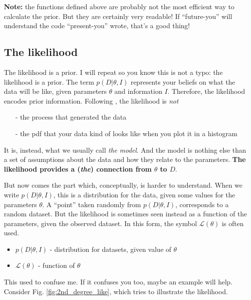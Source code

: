 \documentclass[a4paper,11pt]{article}
\begin{document}
  \textbf{Note:} the functions defined above are probably not the most efficient way to calculate the prior. 
  But they are certainly very readable!
  If ``future-you'' will understand the code ``present-you'' wrote, that's a good thing!





\subsection{The likelihood}\label{sec:likelihood}

The likelihood is a prior.
I will repeat so you know this is not a typo: the likelihood is a prior.
The term $p(D|\theta,I)$ represents your beliefs on what the data will be like, given parameters $\theta$ and information $I$.
Therefore, the likelihood encodes prior information.
%
Following \cite{Brewer2013}, the likelihood is \emph{not} 
\begin{itemize}
   \item[-] the process that generated the data
   \item[-] the pdf that your data kind of looks like when you plot it in a histogram
\end{itemize}

It is, instead, what we usually call \emph{the model}.
And the model is nothing else than a set of assumptions about the data and how they relate to the parameters.
\textbf{The likelihood provides a (\emph{the}) connection from $\theta$ to $D$}.

But now comes the part which, conceptually, is harder to understand. 
When we write $p(D|\theta,I)$, this is a distribution for the data, given some values for the parameters $\theta$.
A ``point'' taken randomly from $p(D|\theta,I)$, corresponds to a random dataset.
But the likelihood is sometimes seen instead as a function of the parameters, given the observed dataset. 
In this form, the symbol $\mathcal{L}(\theta)$ is often used.

\begin{itemize}
  \item $p(D|\theta,I)$ - distribution for datasets, given value of $\theta$
  \item $\mathcal{L}(\theta)$ - function of $\theta$
\end{itemize}

This used to confuse me. 
If it confuses you too, maybe an example will help.
Consider Fig. \ref{fig:2nd_degree_like}, which tries to illustrate the likelihood.
\end{document}
